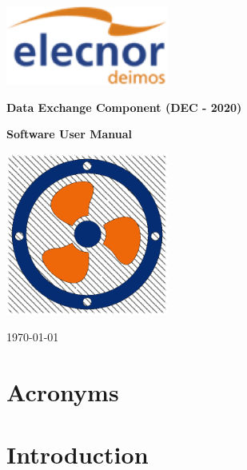 \documentclass[
	oneside,
	openany,
	a4paper,
	headings=optiontoheadandtoc
	]{book}
\begin{document}

\begin{titlepage}
	\begin{center}
		
		\includegraphics[width=0.4\textwidth]{logo_elecnor_deimos.png}
		
		\vspace*{1cm}
		\Large
		\textbf{Data Exchange Component (DEC - 2020)}
		
		\textbf{Software User Manual}
		
		\vspace*{1cm}
		
		\includegraphics[width=0.4\textwidth]{DEC_Logo_White.png}
		
		\vspace{0.8cm}
		
		\today
		
	\end{center}
\end{titlepage}
	


\tableofcontents
\newpage

\chapter{Acronyms}
 
\newpage
 
\chapter{Introduction}

\newpage
\end{document}
